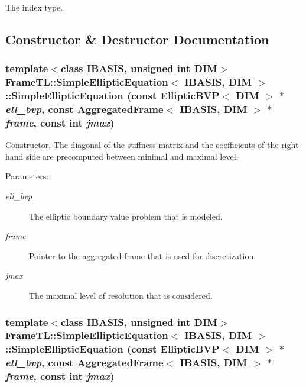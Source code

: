The index type. 

\subsection{Constructor \& Destructor Documentation}
\hypertarget{classFrameTL_1_1SimpleEllipticEquation_d043ab2f1d2d62e13a2241ec148a10a2}{
\subsubsection[SimpleEllipticEquation]{\setlength{\rightskip}{0pt plus 5cm}template$<$class IBASIS, unsigned int DIM$>$ {\bf FrameTL::SimpleEllipticEquation}$<$ IBASIS, DIM $>$::{\bf SimpleEllipticEquation} (const EllipticBVP$<$ DIM $>$ $\ast$ {\em ell\_\-bvp}, \/  const {\bf AggregatedFrame}$<$ IBASIS, DIM $>$ $\ast$ {\em frame}, \/  const int {\em jmax})}}
\label{classFrameTL_1_1SimpleEllipticEquation_d043ab2f1d2d62e13a2241ec148a10a2}


Constructor. The diagonal of the stiffness matrix and the coefficients of the right-hand side are precomputed between minimal and maximal level.

\begin{Desc}
\item[Parameters:]
\begin{description}
\item[{\em ell\_\-bvp}]The elliptic boundary value problem that is modeled. \item[{\em frame}]Pointer to the aggregated frame that is used for discretization. \item[{\em jmax}]The maximal level of resolution that is considered. \end{description}
\end{Desc}
\hypertarget{classFrameTL_1_1SimpleEllipticEquation_d043ab2f1d2d62e13a2241ec148a10a2}{
\subsubsection[SimpleEllipticEquation]{\setlength{\rightskip}{0pt plus 5cm}template$<$class IBASIS, unsigned int DIM$>$ {\bf FrameTL::SimpleEllipticEquation}$<$ IBASIS, DIM $>$::{\bf SimpleEllipticEquation} (const EllipticBVP$<$ DIM $>$ $\ast$ {\em ell\_\-bvp}, \/  const {\bf AggregatedFrame}$<$ IBASIS, DIM $>$ $\ast$ {\em frame}, \/  const int {\em jmax})}}
\label{classFrameTL_1_1SimpleEllipticEquation_d043ab2f1d2d62e13a2241ec148a10a2}



